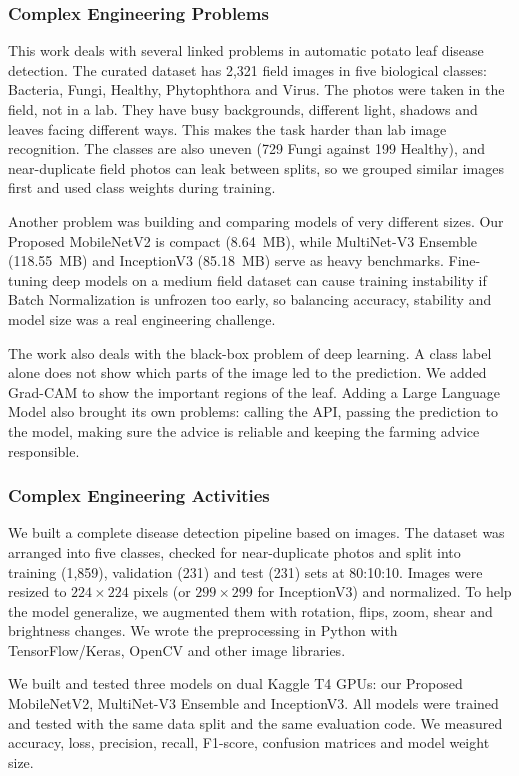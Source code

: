 \subsubsection{Complex Engineering Problems}
This work deals with several linked problems in automatic potato leaf disease detection. The curated dataset has 2,321 field images in five biological classes: Bacteria, Fungi, Healthy, Phytophthora and Virus. The photos were taken in the field, not in a lab. They have busy backgrounds, different light, shadows and leaves facing different ways. This makes the task harder than lab image recognition. The classes are also uneven (729 Fungi against 199 Healthy), and near-duplicate field photos can leak between splits, so we grouped similar images first and used class weights during training.

Another problem was building and comparing models of very different sizes. Our Proposed MobileNetV2 is compact (8.64~MB), while MultiNet-V3 Ensemble (118.55~MB) and InceptionV3 (85.18~MB) serve as heavy benchmarks. Fine-tuning deep models on a medium field dataset can cause training instability if Batch Normalization is unfrozen too early, so balancing accuracy, stability and model size was a real engineering challenge.

The work also deals with the black-box problem of deep learning. A class label alone does not show which parts of the image led to the prediction. We added Grad-CAM to show the important regions of the leaf. Adding a Large Language Model also brought its own problems: calling the API, passing the prediction to the model, making sure the advice is reliable and keeping the farming advice responsible.

\subsubsection{Complex Engineering Activities}
We built a complete disease detection pipeline based on images. The dataset was arranged into five classes, checked for near-duplicate photos and split into training (1,859), validation (231) and test (231) sets at 80:10:10. Images were resized to $224 \times 224$ pixels (or $299 \times 299$ for InceptionV3) and normalized. To help the model generalize, we augmented them with rotation, flips, zoom, shear and brightness changes. We wrote the preprocessing in Python with TensorFlow/Keras, OpenCV and other image libraries.

We built and tested three models on dual Kaggle T4 GPUs: our Proposed MobileNetV2, MultiNet-V3 Ensemble and InceptionV3. All models were trained and tested with the same data split and the same evaluation code. We measured accuracy, loss, precision, recall, F1-score, confusion matrices and model weight size.

